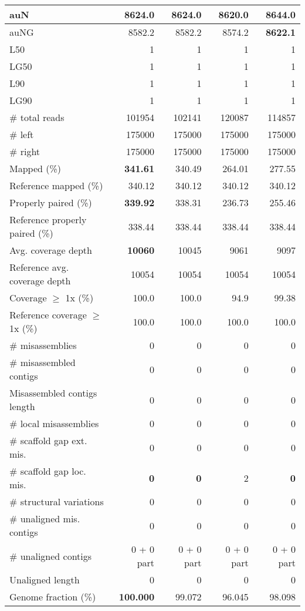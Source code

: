 \documentclass[12pt,a4paper]{article}
\begin{document}
\begin{table}[ht]
\begin{center}
\begin{tabular}{|l*{4}{|r}|}
auN & 8624.0 & 8624.0 & 8620.0 & {\bf 8644.0} \\ \hline
auNG & 8582.2 & 8582.2 & 8574.2 & {\bf 8622.1} \\ \hline
L50 & 1 & 1 & 1 & 1 \\ \hline
LG50 & 1 & 1 & 1 & 1 \\ \hline
L90 & 1 & 1 & 1 & 1 \\ \hline
LG90 & 1 & 1 & 1 & 1 \\ \hline
\# total reads & 101954 & 102141 & 120087 & 114857 \\ \hline
\# left & 175000 & 175000 & 175000 & 175000 \\ \hline
\# right & 175000 & 175000 & 175000 & 175000 \\ \hline
Mapped (\%) & {\bf 341.61} & 340.49 & 264.01 & 277.55 \\ \hline
Reference mapped (\%) & 340.12 & 340.12 & 340.12 & 340.12 \\ \hline
Properly paired (\%) & {\bf 339.92} & 338.31 & 236.73 & 255.46 \\ \hline
Reference properly paired (\%) & 338.44 & 338.44 & 338.44 & 338.44 \\ \hline
Avg. coverage depth & {\bf 10060} & 10045 & 9061 & 9097 \\ \hline
Reference avg. coverage depth & 10054 & 10054 & 10054 & 10054 \\ \hline
Coverage $\geq$ 1x (\%) & 100.0 & 100.0 & 94.9 & 99.38 \\ \hline
Reference coverage $\geq$ 1x (\%) & 100.0 & 100.0 & 100.0 & 100.0 \\ \hline
\# misassemblies & 0 & 0 & 0 & 0 \\ \hline
\# misassembled contigs & 0 & 0 & 0 & 0 \\ \hline
Misassembled contigs length & 0 & 0 & 0 & 0 \\ \hline
\# local misassemblies & 0 & 0 & 0 & 0 \\ \hline
\# scaffold gap ext. mis. & 0 & 0 & 0 & 0 \\ \hline
\# scaffold gap loc. mis. & {\bf 0} & {\bf 0} & 2 & {\bf 0} \\ \hline
\# structural variations & 0 & 0 & 0 & 0 \\ \hline
\# unaligned mis. contigs & 0 & 0 & 0 & 0 \\ \hline
\# unaligned contigs & 0 + 0 part & 0 + 0 part & 0 + 0 part & 0 + 0 part \\ \hline
Unaligned length & 0 & 0 & 0 & 0 \\ \hline
Genome fraction (\%) & {\bf 100.000} & 99.072 & 96.045 & 98.098 \\ \hline

\end{tabular}
\end{center}
\end{table}
\end{document}
